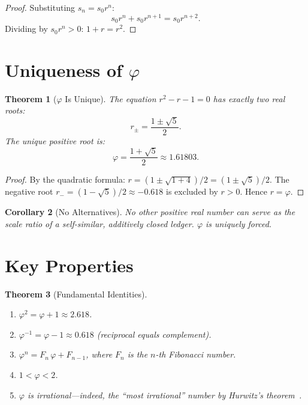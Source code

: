 \documentclass[12pt,a4paper]{article}
\newtheorem{theorem}{Theorem}[section]
\newtheorem{corollary}[theorem]{Corollary}
\theoremstyle{definition}
\theoremstyle{remark}
\begin{document}
\begin{proof}
Substituting $s_n = s_0 r^n$:
\begin{equation}
  s_0 r^n + s_0 r^{n+1} = s_0 r^{n+2}.
\end{equation}
Dividing by $s_0 r^n > 0$: $1 + r = r^2$.
\end{proof}

\section{Uniqueness of $\varphi$}
\label{sec:uniqueness}

\begin{theorem}[$\varphi$ Is Unique]
\label{thm:unique}
The equation $r^2 - r - 1 = 0$ has exactly two real roots:
\begin{equation}
  r_\pm = \frac{1 \pm \sqrt{5}}{2}.
\end{equation}
The unique positive root is:
\begin{equation}
  \boxed{\varphi = \frac{1 + \sqrt{5}}{2} \approx 1.61803.}
\end{equation}
\end{theorem}

\begin{proof}
By the quadratic formula:
$r = (1 \pm \sqrt{1+4})/2 = (1 \pm \sqrt{5})/2$.
The negative root $r_- = (1-\sqrt{5})/2 \approx -0.618$ is
excluded by $r > 0$.  Hence $r = \varphi$.
\end{proof}

\begin{corollary}[No Alternatives]
\label{cor:no-alt}
No other positive real number can serve as the scale ratio of
a self-similar, additively closed ledger.  $\varphi$ is uniquely
forced.
\end{corollary}

\section{Key Properties}
\label{sec:properties}

\begin{theorem}[Fundamental Identities]
\label{thm:identities}
\begin{enumerate}[label=(\roman*)]
  \item $\varphi^2 = \varphi + 1 \approx 2.618$.
  \item $\varphi^{-1} = \varphi - 1 \approx 0.618$
  (reciprocal equals complement).
  \item $\varphi^n = F_n\,\varphi + F_{n-1}$, where $F_n$ is
  the $n$-th Fibonacci number.
  \item $1 < \varphi < 2$.
  \item $\varphi$ is irrational---indeed, the ``most
  irrational'' number by Hurwitz's theorem~\cite{Hardy1979}.
\end{enumerate}
\end{theorem}
\end{document}
